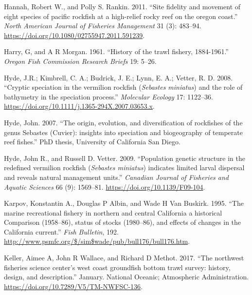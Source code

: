\documentclass[11pt,
  english,
  a4paper,
]{article}
\newlength{\cslhangindent}
\newenvironment{CSLReferences}[2] %
 {%
  \setlength{\parindent}{0pt}
  \ifodd #1 \everypar{\setlength{\hangindent}{\cslhangindent}}\ignorespaces\fi
  \ifnum #2 > 0
  \setlength{\parskip}{#2\baselineskip}
  \fi
 }%
 {}
\begin{document}
\begin{CSLReferences}{1}{0}
\leavevmode{}%
Hannah, Robert W., and Polly S. Rankin. 2011. {``{Site fidelity and movement of eight species of pacific rockfish at a high-relief rocky reef on the oregon coast}.''} \emph{North American Journal of Fisheries Management} 31 (3): 483--94. \url{https://doi.org/10.1080/02755947.2011.591239}.

\leavevmode{}%
Harry, G, and A R Morgan. 1961. {``{History of the trawl fishery, 1884-1961}.''} \emph{Oregon Fish Commission Research Briefs} 19: 5--26.

\leavevmode{}%
Hyde, J.R.; Kimbrell, C. A.; Budrick, J. E.; Lynn, E. A.; Vetter, R. D. 2008. {``{Cryptic speciation in the vermilion rockfish (\emph{Sebastes miniatus}) and the role of bathymetry in the speciation process}.''} \emph{Molecular Ecology} 17: 1122--36. \url{https://doi.org/10.1111/j.1365-294X.2007.03653.x}.

\leavevmode{}%
Hyde, John. 2007. {``{The origin, evolution, and diversification of rockfishes of the genus Sebastes (Cuvier): insights into speciation and biogeography of temperate reef fishes}.''} PhD thesis, University of California San Diego.

\leavevmode{}%
Hyde, John R., and Russell D. Vetter. 2009. {``{Population genetic structure in the redefined vermilion rockfish (\emph{Sebastes miniatus}) indicates limited larval dispersal and reveals natural management units}.''} \emph{Canadian Journal of Fisheries and Aquatic Sciences} 66 (9): 1569--81. \url{https://doi.org/10.1139/F09-104}.

\leavevmode{}%
Karpov, Konstantin A., Douglas P Albin, and Wade H Van Buskirk. 1995. {``{The marine recreational fishery in northern and central California a historical Comparison (1958--86), status of stocks (1980--86), and effects of changes in the California current}.''} \emph{Fish Bulletin}, 192. \url{http://www.psmfc.org/$/sim$wade/pub/bull176/bull176.htm}.

\leavevmode{}%
Keller, Aimee A, John R Wallace, and Richard D Methot. 2017. {``{The northwest fisheries science center's west coast groundfish bottom trawl survey: history, design, and description}.''} January. National Oceanic; Atmospheric Administration. \url{https://doi.org/10.7289/V5/TM-NWFSC-136}.


\end{CSLReferences}
\end{document}
